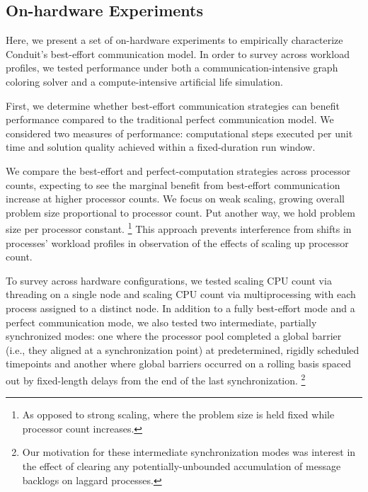 \subsection{On-hardware Experiments}

Here, we present a set of on-hardware experiments to empirically characterize Conduit's best-effort communication model.
In order to survey across workload profiles, we tested performance under both a communication-intensive graph coloring solver and a compute-intensive artificial life simulation.

First, we determine whether best-effort communication strategies can benefit performance compared to the traditional perfect communication model.
We considered two measures of performance: computational steps executed per unit time and solution quality achieved within a fixed-duration run window.

We compare the best-effort and perfect-computation strategies across processor counts, expecting to see the marginal benefit from best-effort communication increase at higher processor counts.
We focus on weak scaling, growing overall problem size proportional to processor count.
Put another way, we hold problem size per processor constant.%
\footnote{
As opposed to strong scaling, where the problem size is held fixed while processor count increases.
}
This approach prevents interference from shifts in processes' workload profiles in observation of the effects of scaling up processor count.

To survey across hardware configurations, we tested scaling CPU count via threading on a single node and scaling CPU count via multiprocessing with each process assigned to a distinct node.
In addition to a fully best-effort mode and a perfect communication mode, we also tested two intermediate, partially synchronized modes: one where the processor pool completed a global barrier (i.e., they aligned at a synchronization point) at predetermined, rigidly scheduled timepoints and another where global barriers occurred on a rolling basis spaced out by fixed-length delays from the end of the last synchronization.%
\footnote{
Our motivation for these intermediate synchronization modes was interest in the effect of clearing any potentially-unbounded accumulation of message backlogs on laggard processes.
}

